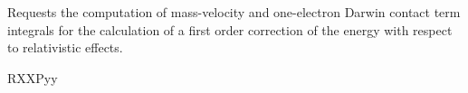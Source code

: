 \begin{keywordlist}
Requests the computation of mass-{}velocity and one-{}electron Darwin
contact term integrals for the calculation of a first order correction
of the energy with respect to relativistic effects.
\item[RXXPyy]

\end{keywordlist}
